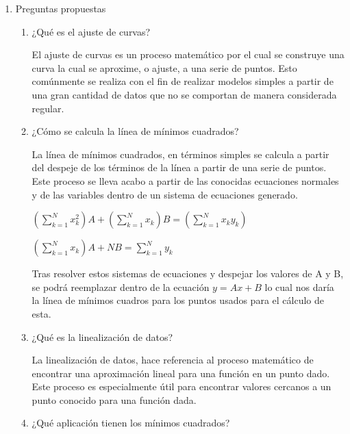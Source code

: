 \documentclass[english,notitlepage,letterpaper, 10pt]{article} %
\begin{document}
\begin{enumerate}
  \item Preguntas propuestas
  
    \begin{enumerate}
      \item ¿Qué es el ajuste de curvas?
      
        El ajuste de curvas es un proceso matemático por el cual se construye una curva la cual se aproxime, o ajuste, a una serie de puntos. Esto comúnmente se realiza con el fin de realizar modelos simples a partir de una gran cantidad de datos que no se comportan de manera considerada regular.
  
      \item ¿Cómo se calcula la línea de mínimos cuadrados?
      
        La línea de mínimos cuadrados, en términos simples se calcula a partir del despeje de los términos de la línea a partir de una serie de puntos. Este proceso se lleva acabo a partir de las conocidas ecuaciones normales y de las variables dentro de un sistema de ecuaciones generado.
  
        \begin{center}
            \begin{math}
                \displaystyle \left( \sum_{k=1}^{N} x^2_k \right)  A + \left( \sum_{k=1}^{N} x_k \right) B = \left( \sum_{k=1}^{N} x_k y_k \right)
            \end{math}

            \begin{math}
                \displaystyle \left( \sum_{k=1}^{N} x_k \right) A + NB = \sum_{k=1}^N y_k
            \end{math}
        \end{center}
  
        Tras resolver estos sistemas de ecuaciones y despejar los valores de A y B, se podrá reemplazar dentro de la ecuación $y=Ax+B$ lo cual nos daría la línea de mínimos cuadros para los puntos usados para el cálculo de esta.
  
      \item ¿Qué es la linealización de datos?
      
        La linealización de datos, hace referencia al proceso matemático de encontrar una aproximación lineal para una función en un punto dado. Este proceso es especialmente útil para encontrar valores cercanos a un punto conocido para una función dada.

      \item ¿Qué aplicación tienen los mínimos cuadrados?
      

\end{enumerate}
\end{enumerate}
\end{document}
